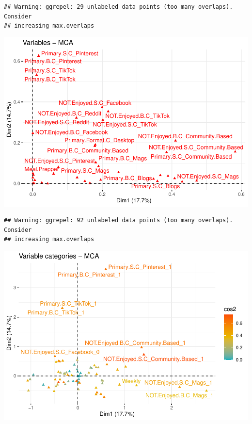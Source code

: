 \documentclass[
]{article}
\newenvironment{Shaded}{\begin{snugshade}}{\end{snugshade}}
\newcommand{\DataTypeTok}[1]{\textcolor[rgb]{0.13,0.29,0.53}{#1}}
\newcommand{\KeywordTok}[1]{\textcolor[rgb]{0.13,0.29,0.53}{\textbf{#1}}}
\newcommand{\NormalTok}[1]{#1}
\newcommand{\OtherTok}[1]{\textcolor[rgb]{0.56,0.35,0.01}{#1}}
\newcommand{\StringTok}[1]{\textcolor[rgb]{0.31,0.60,0.02}{#1}}
\begin{document}
\begin{verbatim}
## Warning: ggrepel: 29 unlabeled data points (too many overlaps). Consider
## increasing max.overlaps
\end{verbatim}

\includegraphics{Average-User-MCA_files/figure-latex/diet no not enjoyed-2.pdf}

\begin{Shaded}
\end{Shaded}

\begin{verbatim}
## Warning: ggrepel: 92 unlabeled data points (too many overlaps). Consider
## increasing max.overlaps
\end{verbatim}

\includegraphics{Average-User-MCA_files/figure-latex/diet no not enjoyed-3.pdf}
\end{document}

